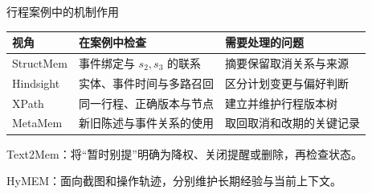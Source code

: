 \begin{frame}{行程案例中的机制作用}
    \small
    \begin{tabularx}{\linewidth}{@{}>{\raggedright\arraybackslash}p{25mm}YY@{}}
        \toprule
        视角 & 在案例中检查 & 需要处理的问题 \\
        \midrule
        StructMem & 事件绑定与 $s_2,s_3$ 的联系 & 摘要保留取消关系与来源\\[2mm]
        Hindsight & 实体、事件时间与多路召回 & 区分计划变更与偏好判断\\[2mm]
        XPath & 同一行程、正确版本与节点 & 建立并维护行程版本树\\[2mm]
        MetaMem & 新旧陈述与事件关系的使用 & 取回取消和改期的关键记录\\
        \bottomrule
    \end{tabularx}
    \par\vspace{3mm}Text2Mem：将“暂时别提”明确为降权、关闭提醒或删除，再检查状态。\par
    HyMEM：面向截图和操作轨迹，分别维护长期经验与当前上下文。\par
\end{frame}

